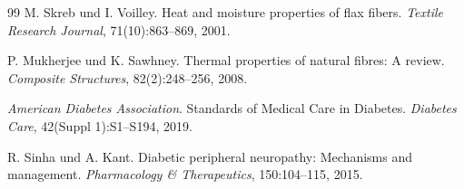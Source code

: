 \documentclass[a4paper,12pt]{article}
\theoremstyle{definition}
\begin{document}
\begin{thebibliography}{99}
    M. Skreb und I. Voilley.
    Heat and moisture properties of flax fibers.
    \textit{Textile Research Journal}, 71(10):863--869, 2001.

    P. Mukherjee und K. Sawhney.
    Thermal properties of natural fibres: A review.
    \textit{Composite Structures}, 82(2):248--256, 2008.

    \textit{American Diabetes Association}. Standards of Medical Care in Diabetes.
    \textit{Diabetes Care}, 42(Suppl 1):S1--S194, 2019.

    R. Sinha und A. Kant.
    Diabetic peripheral neuropathy: Mechanisms and management.
    \textit{Pharmacology \& Therapeutics}, 150:104--115, 2015.

\end{thebibliography}
\end{document}
